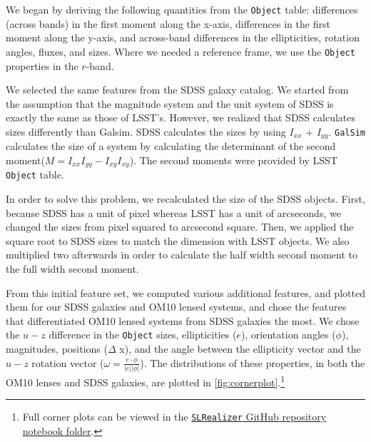 \documentclass[\docopts]{\docclass}
\def\SLRealizer{\texttt{SLRealizer}\xspace}
\def\Object{\texttt{Object}\xspace}
\def\GalSim{\texttt{GalSim}\xspace}
\begin{document}
We began by deriving the following quantities from the \Object table:
differences (across bands) in the first moment along the x-axis,
differences in the first moment along the y-axis,  and across-band
differences in the ellipticities, rotation angles, fluxes, and sizes.
Where we needed a reference frame, we use the \Object properties in the
$r$-band.

We selected the same features from the SDSS galaxy catalog. We started from the assumption that the magnitude system and the unit system of SDSS is exactly the same as those of LSST’s. However, we realized that SDSS calculates sizes differently than Galsim. SDSS calculates the sizes by using $I_{xx}$ + $I_{yy}$. \GalSim calculates
the size of a system by calculating the determinant of the second moment($M=I_{xx}I_{yy}-I_{xy}I_{xy}$). The second moments were provided by LSST \Object table.

In order to solve this problem, we recalculated the size of the SDSS objects. First, because SDSS has a unit of pixel whereas LSST has a unit of arcseconds, we changed the sizes from pixel squared to arcsecond square. Then, we applied the square root to SDSS sizes to match the dimension with LSST objects. We also multiplied two afterwards in order to calculate the half width second moment to the full width second moment.

From this initial feature set, we computed various additional features,
and  plotted them for our SDSS galaxies and OM10 lensed systems, and
chose the features that differentiated OM10 lensed systems from SDSS
galaxies the most. We chose the $u-z$ difference in the \Object sizes,
ellipticities ($e$), orientation angles ($\phi$), magnitudes, positions
($\Delta$ x), and the angle between the ellipticity vector and the $u-z$
rotation vector ($\omega = \frac{e \cdot \phi}{ \left| e \right| \left |
\phi \right |}$).
The distributions of these properties, in both the OM10
lenses and SDSS galaxies, are plotted in
\autoref{fig:cornerplot}.\footnote{Full corner plots can be viewed in
the
\href{https://github.com/jennykim1016/SLRealizer/blob/master/notebooks/SDSSvsOM10.ipynb}{\SLRealizer
GitHub repository notebook folder}.}
\end{document}
